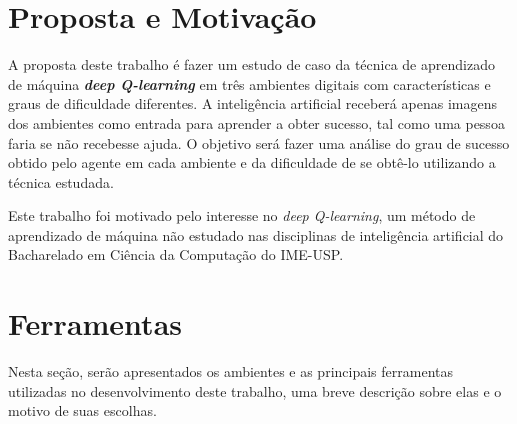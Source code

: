 \section{Proposta e Motivação}
\label{sec:motivacao_proposta}

A proposta deste trabalho é fazer um estudo de caso da técnica de aprendizado de máquina \textbf{\textit{deep Q-learning}} em três ambientes digitais com características e graus de dificuldade diferentes.
A inteligência artificial receberá apenas imagens dos ambientes como entrada para aprender a obter sucesso, tal como uma pessoa faria se não recebesse ajuda.
O objetivo será fazer uma análise do grau de sucesso obtido pelo agente em cada ambiente e da dificuldade de se obtê-lo utilizando a técnica estudada.

Este trabalho foi motivado pelo interesse no \textit{deep Q-learning}, um método de aprendizado de máquina não estudado nas disciplinas de inteligência artificial do Bacharelado em Ciência da Computação do IME-USP.




\section{Ferramentas}
\label{sec:tools}
Nesta seção, serão apresentados os ambientes e as principais ferramentas utilizadas no desenvolvimento deste trabalho, uma breve descrição sobre elas e o motivo de suas escolhas.

